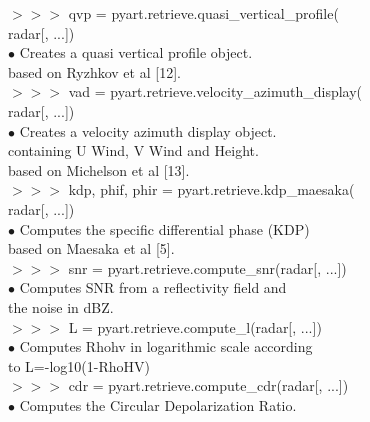 \documentclass[potrait, z1paper, fontscale=0.33]{baposter} %
\begin{document}
\begin{poster}
{\begin{flushleft}
$>$$>$$>$ qvp = pyart.retrieve.quasi\_vertical\_profile(\\
\-\hspace{1.5cm} radar[, ...])\\
\-\hspace{0.4cm} $\bullet$ Creates a quasi vertical profile object.\\
\-\hspace{0.7cm} based on Ryzhkov et al [12].\\
$>$$>$$>$ vad = pyart.retrieve.velocity\_azimuth\_display(\\
\-\hspace{1.5cm} radar[, ...])\\
\-\hspace{0.4cm} $\bullet$ Creates a velocity azimuth display object.\\
\-\hspace{0.7cm} containing U Wind, V Wind and Height.\\
\-\hspace{0.7cm} based on Michelson et al [13].\\
$>$$>$$>$ kdp, phif, phir = pyart.retrieve.kdp\_maesaka(\\
\-\hspace{1.5cm} radar[, ...])\\
\-\hspace{0.4cm} $\bullet$ Computes the specific differential phase (KDP)\\
\-\hspace{0.7cm} based on Maesaka et al [5].\\
$>$$>$$>$ snr = pyart.retrieve.compute\_snr(radar[, ...])\\
\-\hspace{0.4cm} $\bullet$ Computes SNR from a reflectivity field and\\
\-\hspace{0.7cm} the noise in dBZ.\\
$>$$>$$>$ L = pyart.retrieve.compute\_l(radar[, ...])\\
\-\hspace{0.4cm} $\bullet$ Computes Rhohv in logarithmic scale according\\
\-\hspace{0.7cm} to L=-log10(1-RhoHV)\\
$>$$>$$>$ cdr = pyart.retrieve.compute\_cdr(radar[, ...])\\
\-\hspace{0.4cm} $\bullet$ Computes the Circular Depolarization Ratio.\\

\end{flushleft}}
\end{poster}
\end{document}
